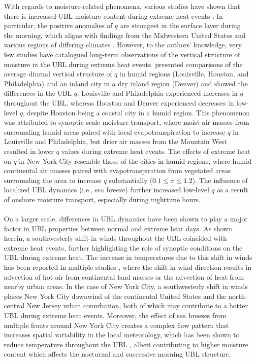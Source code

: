 With regards to moisture-related phenomena, various studies have shown that there is increased UBL moisture content during extreme heat events \citep{kunkel1996, pyrgou2020, zhang2020}. In particular, the positive anomalies of $q$ are strongest in the surface layer during the morning, which aligns with findings from the Midwestern United States \citep{kunkel1996} and various regions of differing climates \citep{zhang2020}. However, to the authors' knowledge, very few studies have catalogued long-term observations of the vertical structure of moisture in the UBL during extreme heat events. \citet{zhang2020} presented comparisons of the average diurnal vertical structure of $q$ in humid regions (Louisville, Houston, and Philadelphia) and an inland city in a dry inland region (Denver) and showed the differences in the UBL $q$. Louisville and Philadelphia experienced increases in $q$ throughout the UBL, whereas Houston and Denver experienced decreases in low-level $q$, despite Houston being a coastal city in a humid region. This phenomenon was attributed to synoptic-scale moisture transport, where moist air masses from surrounding humid areas paired with local evapotranspiration to increase $q$ in Louisville and Philadelphia, but drier air masses from the Mountain West resulted in lower $q$ values during extreme heat events. The effects of extreme heat on $q$ in New York City resemble those of the cities in humid regions, where humid continental air masses paired with evapotranspiration from vegetated areas surrounding the area to increase $q$ substantially ($0.1 \leq \sigma \leq 1.2$). The influence of localized UBL dynamics (i.e., sea breeze) further increased low-level $q$ as a result of onshore moisture transport, especially during nighttime hours. 
\\ \\
On a larger scale, differences in UBL dynamics have been shown to play a major factor in UBL properties between normal and extreme heat days. As shown herein, a southwesterly shift in winds throughout the UBL coincided with extreme heat events, further highlighting the role of synoptic conditions on the UBL during extreme heat. The increase in temperatures due to this shift in winds has been reported in multiple studies \citep{heaviside2015, jiang2019, ramamurthy2017b}, where the shift in wind direction results in advection of hot air from continental land masses or the advection of heat from nearby urban areas. In the case of New York City, a southwesterly shift in winds places New York City downwind of the continental United States and the north-central New Jersey urban conurbation, both of which may contribute to a hotter UBL during extreme heat events. Moreover, the effect of sea breezes from multiple fronts around New York City creates a complex flow pattern that increases spatial variability in the local meteorology, which has been shown to reduce temperature throughout the UBL \citep{han2022, hirsch2021, lee2021}, albeit contributing to higher moisture content which affects the nocturnal and successive morning UBL structure. 
